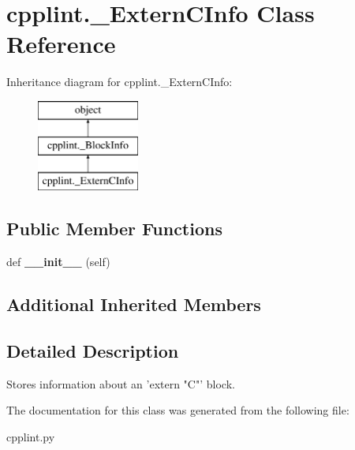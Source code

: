 \hypertarget{classcpplint_1_1__ExternCInfo}{}\section{cpplint.\+\_\+\+Extern\+C\+Info Class Reference}
\label{classcpplint_1_1__ExternCInfo}
Inheritance diagram for cpplint.\+\_\+\+Extern\+C\+Info\+:\begin{figure}[H]
\begin{center}
\leavevmode
\includegraphics[height=3.000000cm]{classcpplint_1_1__ExternCInfo}
\end{center}
\end{figure}
\subsection*{Public Member Functions}
\begin{DoxyCompactItemize}
\item 
def {\bfseries \+\_\+\+\_\+init\+\_\+\+\_\+} (self)\hypertarget{classcpplint_1_1__ExternCInfo_a104a3dbf48a9fda7426775041d82f60a}{}\label{classcpplint_1_1__ExternCInfo_a104a3dbf48a9fda7426775041d82f60a}

\end{DoxyCompactItemize}
\subsection*{Additional Inherited Members}


\subsection{Detailed Description}
\begin{DoxyVerb}Stores information about an 'extern "C"' block.\end{DoxyVerb}
 

The documentation for this class was generated from the following file\+:\begin{DoxyCompactItemize}
\item 
cpplint.\+py\end{DoxyCompactItemize}
